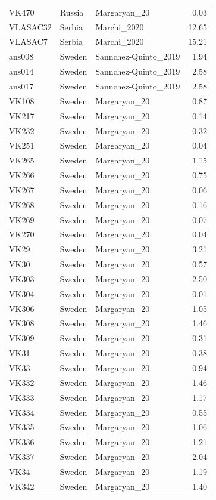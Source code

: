 \begin{longtable}[t]{lllr}
VK470 & Russia & Margaryan\_20 & 0.03\\
VLASAC32 & Serbia & Marchi\_2020 & 12.65\\
VLASAC7 & Serbia & Marchi\_2020 & 15.21\\
ans008 & Sweden & Sannchez-Quinto\_2019 & 1.94\\
ans014 & Sweden & Sannchez-Quinto\_2019 & 2.58\\
ans017 & Sweden & Sannchez-Quinto\_2019 & 2.58\\
VK108 & Sweden & Margaryan\_20 & 0.87\\
VK217 & Sweden & Margaryan\_20 & 0.14\\
VK232 & Sweden & Margaryan\_20 & 0.32\\
VK251 & Sweden & Margaryan\_20 & 0.04\\
VK265 & Sweden & Margaryan\_20 & 1.15\\
VK266 & Sweden & Margaryan\_20 & 0.75\\
VK267 & Sweden & Margaryan\_20 & 0.06\\
VK268 & Sweden & Margaryan\_20 & 0.16\\
VK269 & Sweden & Margaryan\_20 & 0.07\\
VK270 & Sweden & Margaryan\_20 & 0.04\\
VK29 & Sweden & Margaryan\_20 & 3.21\\
VK30 & Sweden & Margaryan\_20 & 0.57\\
VK303 & Sweden & Margaryan\_20 & 2.50\\
VK304 & Sweden & Margaryan\_20 & 0.01\\
VK306 & Sweden & Margaryan\_20 & 1.05\\
VK308 & Sweden & Margaryan\_20 & 1.46\\
VK309 & Sweden & Margaryan\_20 & 0.31\\
VK31 & Sweden & Margaryan\_20 & 0.38\\
VK33 & Sweden & Margaryan\_20 & 0.94\\
VK332 & Sweden & Margaryan\_20 & 1.46\\
VK333 & Sweden & Margaryan\_20 & 1.17\\
VK334 & Sweden & Margaryan\_20 & 0.55\\
VK335 & Sweden & Margaryan\_20 & 1.06\\
VK336 & Sweden & Margaryan\_20 & 1.21\\
VK337 & Sweden & Margaryan\_20 & 2.04\\
VK34 & Sweden & Margaryan\_20 & 1.19\\
VK342 & Sweden & Margaryan\_20 & 1.40\\

\end{longtable}
